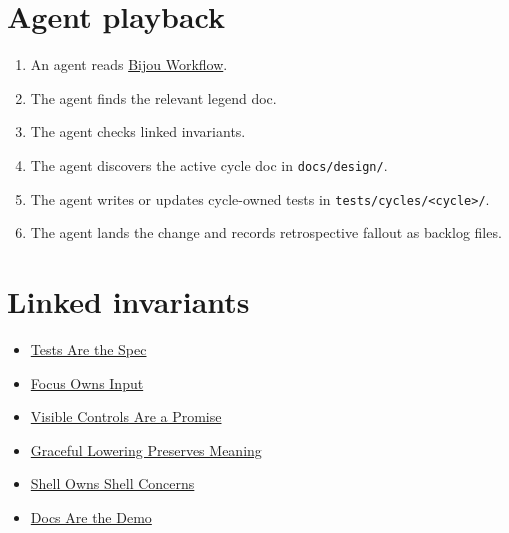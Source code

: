 \section{Agent playback}\label{record-200-agent-playback}

\begin{enumerate}
\def\labelenumi{\arabic{enumi}.}
\tightlist
\item
  An agent reads \href{https://github.com/flyingrobots/bijou/blob/cbd70612140e7a450d764b3c7be1c6af878b99bc/docs/WORKFLOW.md}{Bijou Workflow}.
\item
  The agent finds the relevant legend doc.
\item
  The agent checks linked invariants.
\item
  The agent discovers the active cycle doc in \texttt{d\allowbreak{}o\allowbreak{}c\allowbreak{}s\allowbreak{}/\allowbreak{}d\allowbreak{}e\allowbreak{}s\allowbreak{}i\allowbreak{}g\allowbreak{}n\allowbreak{}/}.
\item
  The agent writes or updates cycle-owned tests in \texttt{t\allowbreak{}e\allowbreak{}s\allowbreak{}t\allowbreak{}s\allowbreak{}/\allowbreak{}c\allowbreak{}y\allowbreak{}c\allowbreak{}l\allowbreak{}e\allowbreak{}s\allowbreak{}/\allowbreak{}<\allowbreak{}c\allowbreak{}y\allowbreak{}c\allowbreak{}l\allowbreak{}e\allowbreak{}>\allowbreak{}/}.
\item
  The agent lands the change and records retrospective fallout as backlog files.
\end{enumerate}

\section{Linked invariants}\label{record-200-linked-invariants}

\begin{itemize}
\tightlist
\item
  \href{https://github.com/flyingrobots/bijou/blob/cbd70612140e7a450d764b3c7be1c6af878b99bc/docs/invariants/tests-are-the-spec.md}{Tests Are the Spec}
\item
  \href{https://github.com/flyingrobots/bijou/blob/cbd70612140e7a450d764b3c7be1c6af878b99bc/docs/invariants/focus-owns-input.md}{Focus Owns Input}
\item
  \href{https://github.com/flyingrobots/bijou/blob/cbd70612140e7a450d764b3c7be1c6af878b99bc/docs/invariants/visible-controls-are-a-promise.md}{Visible Controls Are a Promise}
\item
  \href{https://github.com/flyingrobots/bijou/blob/cbd70612140e7a450d764b3c7be1c6af878b99bc/docs/invariants/graceful-lowering-preserves-meaning.md}{Graceful Lowering Preserves Meaning}
\item
  \href{https://github.com/flyingrobots/bijou/blob/cbd70612140e7a450d764b3c7be1c6af878b99bc/docs/invariants/shell-owns-shell-concerns.md}{Shell Owns Shell Concerns}
\item
  \href{https://github.com/flyingrobots/bijou/blob/cbd70612140e7a450d764b3c7be1c6af878b99bc/docs/invariants/docs-are-the-demo.md}{Docs Are the Demo}
\end{itemize}

